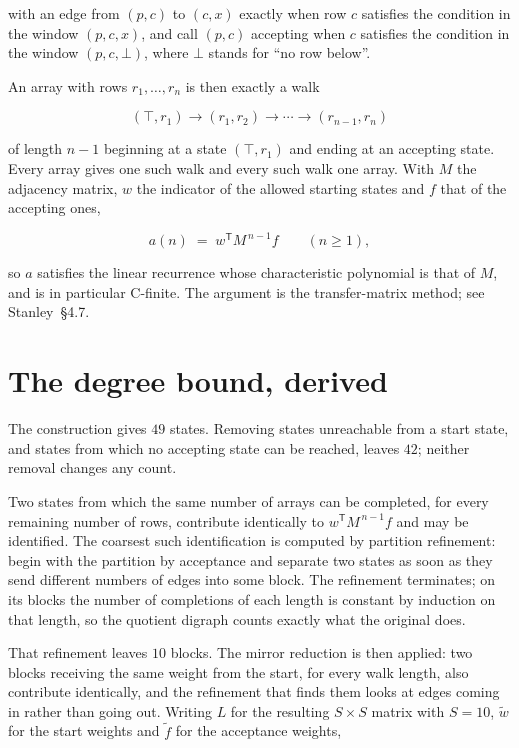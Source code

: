 \documentclass[11pt]{article}
\theoremstyle{definition}
\begin{document}
with an edge from $(p,c)$ to $(c,x)$ exactly when row $c$ satisfies the condition in the window $(p,c,x)$, and call $(p,c)$ accepting when $c$ satisfies the condition in the window $(p,c,\bot)$, where $\bot$ stands for ``no row below''.

An array with rows $r_1,\dots,r_n$ is then exactly a walk

\[(\top,r_1) \to (r_1,r_2) \to \cdots \to (r_{n-1},r_n)\]

of length $n-1$ beginning at a state $(\top,r_1)$ and ending at an accepting state. Every array gives one such walk and every such walk one array. With $M$ the adjacency matrix, $w$ the indicator of the allowed starting states and $f$ that of the accepting ones,

\[a(n) \;=\; w^{\mathsf T} M^{\,n-1} f \qquad (n \ge 1),\]

so $a$ satisfies the linear recurrence whose characteristic polynomial is that of $M$, and is in particular C-finite. The argument is the transfer-matrix method; see Stanley~\S4.7.

\section{The degree bound, derived}

The construction gives $49$ states. Removing states unreachable from a start state, and states from which no accepting state can be reached, leaves $42$; neither removal changes any count.

Two states from which the same number of arrays can be completed, for every remaining number of rows, contribute identically to $w^{\mathsf T}M^{\,n-1}f$ and may be identified. The coarsest such identification is computed by partition refinement: begin with the partition by acceptance and separate two states as soon as they send different numbers of edges into some block. The refinement terminates; on its blocks the number of completions of each length is constant by induction on that length, so the quotient digraph counts exactly what the original does.

That refinement leaves $10$ blocks. The mirror reduction is then applied: two blocks receiving the same weight from the start, for every walk length, also contribute identically, and the refinement that finds them looks at edges coming in rather than going out. Writing $L$ for the resulting $S \times S$ matrix with $S = 10$, $\tilde w$ for the start weights and $\tilde f$ for the acceptance weights,
\end{document}

